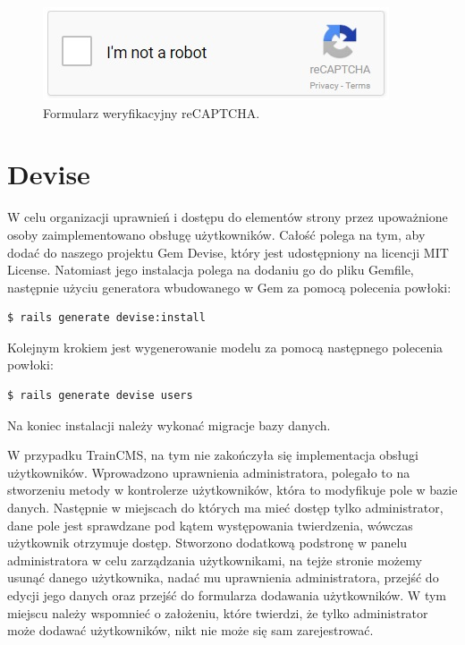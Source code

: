 \documentclass[openright]{xmgr}
\begin{document}
\begin{figure}[!tbh]
\centering
\includegraphics[width=.6\linewidth]{fig/captcha}
\caption{Formularz weryfikacyjny reCAPTCHA.}
\end{figure}

\newpage

\section{Devise}
W celu organizacji uprawnień i dostępu do elementów strony przez upoważnione osoby zaimplementowano obsługę użytkowników. Całość polega na tym, aby dodać do naszego projektu Gem Devise\cite{devise}, który jest udostępniony na licencji MIT License. Natomiast jego instalacja polega na dodaniu go do pliku Gemfile, następnie użyciu generatora wbudowanego w Gem za pomocą polecenia powłoki:
\begin{lstlisting}[language=bashes, caption={Polecenie instalujące Gem Devise w naszym projekcie}]
$ rails generate devise:install
\end{lstlisting}
Kolejnym krokiem jest wygenerowanie modelu za pomocą następnego polecenia powłoki:
\begin{lstlisting}[language=bashes, caption={Polecenie generujące model użytkowników w naszym projekcie}]
$ rails generate devise users
\end{lstlisting}
Na koniec instalacji należy wykonać migracje bazy danych.

W przypadku TrainCMS, na tym nie zakończyła się implementacja obsługi użytkowników. Wprowadzono uprawnienia administratora, polegało to na stworzeniu metody w kontrolerze użytkowników, która to modyfikuje pole w bazie danych. Następnie w miejscach do których ma mieć dostęp tylko administrator, dane pole jest sprawdzane pod kątem występowania twierdzenia, wówczas użytkownik otrzymuje dostęp. Stworzono dodatkową podstronę w panelu administratora w celu zarządzania użytkownikami, na tejże stronie możemy usunąć danego użytkownika, nadać mu uprawnienia administratora, przejść do edycji jego danych oraz przejść do formularza dodawania użytkowników. W tym miejscu należy wspomnieć o założeniu, które twierdzi, że tylko administrator może dodawać użytkowników, nikt nie może się sam zarejestrować.
\end{document}
